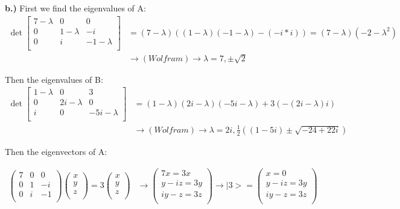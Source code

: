 \documentclass[10pt]{article} %
\newcommand{\ket}[1]{\big|#1\big>}
\begin{document}
\textbf{b.)}
First we find the eigenvalues of A:
\begin{align*}
  \det
  \begin{bmatrix}
    7 -\lambda& 0 & 0\\
    0 & 1 -\lambda& -i\\
    0 & i & -1 -\lambda\\
  \end{bmatrix}
  &= (7-\lambda)\left((1-\lambda)(-1-\lambda) - (-i*i)\right) = \left(7-\lambda\right)\left(-2-\lambda^2\right)\\
  &\rightarrow (Wolfram) \rightarrow \lambda = 7, \pm\sqrt{2} 
\end{align*}

Then the eigenvalues of B:
\begin{align*}
  \det
  \begin{bmatrix}
    1 -\lambda& 0 & 3\\
    0 & 2i-\lambda & 0\\
    i & 0 & -5i-\lambda\\
  \end{bmatrix}
  &= \left(1-\lambda\right)\left(2i-\lambda\right)\left(-5i-\lambda\right) + 3\left(-\left(2i-\lambda\right)i\right)\\
  &\rightarrow (Wolfram) \rightarrow \lambda = 2i, \frac12\left(\left(1-5i\right)\pm\sqrt{-24+22i}\right)
\end{align*}

Then the eigenvectors of A:

\begin{align*}
  \begin{pmatrix}
    7 & 0 & 0\\
    0 & 1 & -i\\
    0 & i & -1\\
  \end{pmatrix}
  \begin{pmatrix}
    x\\
    y\\
    z\\
  \end{pmatrix}
  = 3
  \begin{pmatrix}
    x\\
    y\\
    z\\
  \end{pmatrix}
  &
  \rightarrow
  \begin{pmatrix}
    7x = 3x\\
    y-iz = 3y\\
    iy - z = 3z\\
  \end{pmatrix}
  \rightarrow
  \ket{3} =
  \begin{pmatrix}
    x = 0\\
    y-iz = 3y\\
    iy - z = 3z\\
  \end{pmatrix}
\end{align*}
\end{document}
